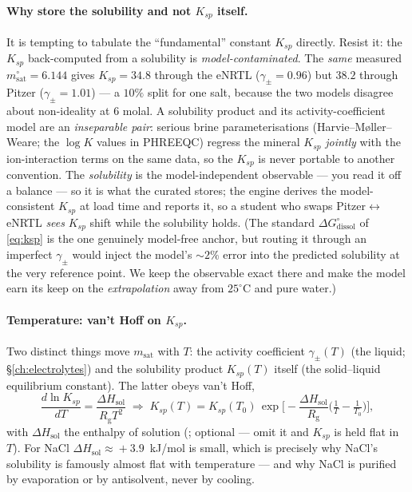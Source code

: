 \documentclass[11pt,a4paper]{article}
\newcommand{\Rgas}{R_{\!\mathrm{g}}}                %
\begin{document}
\paragraph{Why store the solubility and not $K_{sp}$ itself.}  It is
tempting to tabulate the ``fundamental'' constant $K_{sp}$ directly.
Resist it: the $K_{sp}$ back-computed from a solubility is
\emph{model-contaminated}.  The \emph{same} measured
$m_{\text{sat}}^{\circ}=6.144$ gives $K_{sp}=34.8$ through the eNRTL
($\gamma_\pm=0.96$) but $38.2$ through Pitzer ($\gamma_\pm=1.01$) --- a
$10\%$ split for one salt, because the two models disagree about
non-ideality at $6$ molal.  A solubility product and its
activity-coefficient model are an \emph{inseparable pair}: serious brine
parameterisations (Harvie--M\o{}ller--Weare; the $\log K$ values in
PHREEQC) regress the mineral $K_{sp}$ \emph{jointly} with the
ion-interaction terms on the same data, so the $K_{sp}$ is never portable
to another convention.  The \emph{solubility} is the model-independent
observable --- you read it off a balance --- so it is what the curated
 stores; the engine derives the model-consistent $K_{sp}$ at
load time and reports it, so a student who swaps Pitzer$\leftrightarrow$
eNRTL \emph{sees} $K_{sp}$ shift while the solubility holds.  (The standard
$\Delta G^{\circ}_{\text{dissol}}$ of \eqref{eq:ksp} is the one genuinely
model-free anchor, but routing it through an imperfect $\gamma_\pm$ would
inject the model's $\sim\!2\%$ error into the predicted solubility at the
very reference point.  We keep the observable exact there and make the
model earn its keep on the \emph{extrapolation} away from $25^\circ$C and
pure water.)

\paragraph{Temperature: van't Hoff on $K_{sp}$.}  Two distinct things move
$m_{\text{sat}}$ with $T$: the activity coefficient $\gamma_\pm(T)$ (the
liquid; \S\ref{ch:electrolytes}) and the solubility product $K_{sp}(T)$
itself (the solid--liquid equilibrium constant).  The latter obeys van't
Hoff,
\begin{equation}
   \frac{d\ln K_{sp}}{dT} = \frac{\Delta H_{\text{sol}}}{\Rgas T^{2}}
   \;\Longrightarrow\;
   K_{sp}(T) = K_{sp}(T_0)\,
   \exp\!\Big[\!-\frac{\Delta H_{\text{sol}}}{\Rgas}
              \Big(\tfrac1T-\tfrac1{T_0}\Big)\Big],
   \label{eq:ksp-vanthoff}
\end{equation}
with $\Delta H_{\text{sol}}$ the enthalpy of solution
(; optional --- omit it and $K_{sp}$ is held flat
in $T$).  For NaCl $\Delta H_{\text{sol}}\!\approx\!+3.9$~kJ/mol is small,
which is precisely why NaCl's solubility is famously almost
flat with temperature --- and why NaCl is purified by evaporation or by
antisolvent, never by cooling.
\end{document}
